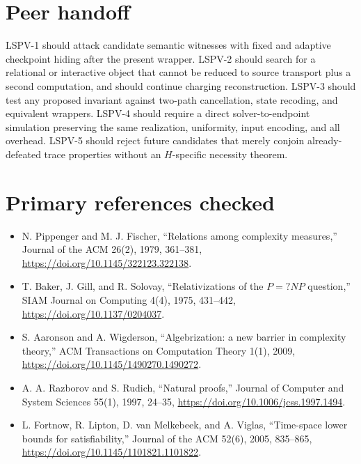 \documentclass[11pt]{article}
\begin{document}
\section*{Peer handoff}
LSPV-1 should attack candidate semantic witnesses with fixed and adaptive
checkpoint hiding after the present wrapper.  LSPV-2 should search for a
relational or interactive object that cannot be reduced to source transport
plus a second computation, and should continue charging reconstruction.
LSPV-3 should test any proposed invariant against two-path cancellation,
state recoding, and equivalent wrappers.  LSPV-4 should require a direct
solver-to-endpoint simulation preserving the same realization, uniformity,
input encoding, and all overhead.  LSPV-5 should reject future candidates that
merely conjoin already-defeated trace properties without an $H$-specific
necessity theorem.

\section*{Primary references checked}
\begin{itemize}
\item N. Pippenger and M. J. Fischer, ``Relations among complexity measures,''
Journal of the ACM 26(2), 1979, 361--381,
\url{https://doi.org/10.1145/322123.322138}.
\item T. Baker, J. Gill, and R. Solovay, ``Relativizations of the $P=?NP$
question,'' SIAM Journal on Computing 4(4), 1975, 431--442,
\url{https://doi.org/10.1137/0204037}.
\item S. Aaronson and A. Wigderson, ``Algebrization: a new barrier in
complexity theory,'' ACM Transactions on Computation Theory 1(1), 2009,
\url{https://doi.org/10.1145/1490270.1490272}.
\item A. A. Razborov and S. Rudich, ``Natural proofs,'' Journal of Computer
and System Sciences 55(1), 1997, 24--35,
\url{https://doi.org/10.1006/jcss.1997.1494}.
\item L. Fortnow, R. Lipton, D. van Melkebeek, and A. Viglas,
``Time-space lower bounds for satisfiability,'' Journal of the ACM 52(6),
2005, 835--865, \url{https://doi.org/10.1145/1101821.1101822}.
\end{itemize}

\end{document}
